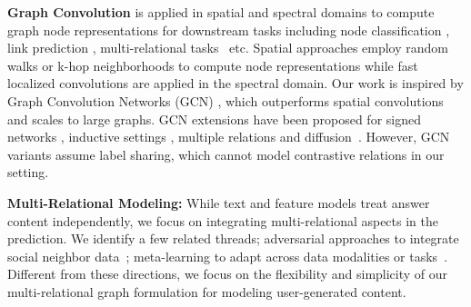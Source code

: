 
\noindent
\textbf{Graph Convolution} is applied in spatial and spectral domains to compute graph node representations for downstream tasks including node classification \cite{gcn}, link prediction \cite{relationalGCN}, multi-relational tasks~\cite{rase} etc. Spatial approaches employ random walks or k-hop neighborhoods to compute node representations \cite{DeepWalk,node2vec,LINE} while fast localized convolutions are applied in the spectral domain\cite{deferrard,duvenaund}. Our work is inspired by Graph Convolution Networks (GCN) \cite{gcn}, which outperforms spatial convolutions and scales to large graphs. GCN extensions have been proposed for signed networks \cite{signedgcn}, inductive settings \cite{graphsage}, multiple relations \cite{DualGCN,relationalGCN} and diffusion~\cite{infvae}. However, GCN variants assume label sharing, which cannot model contrastive relations in our setting.

\noindent
\textbf{Multi-Relational Modeling: } While text and feature models treat answer content independently, we focus on integrating multi-relational aspects in the prediction. We identify a few related threads; adversarial approaches to integrate social neighbor data~\cite{adv_social,adv_neighbor}; meta-learning to adapt across data modalities or tasks~\cite{maml}. Different from these directions, we focus on the flexibility and simplicity of our multi-relational graph formulation for modeling user-generated content.
